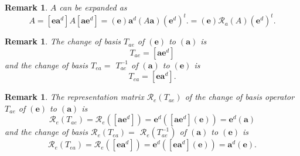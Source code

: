 \documentclass[aps,preprint]{revtex4}%
\newtheorem{remark}[theorem]{Remark}
\begin{document}
\begin{remark}
$A$ can be expanded as%
\begin{equation}
A=\left[  \mathbf{ea}^{d}\right]  A\left[  \mathbf{ae}^{d}\right]  =\left(
\mathbf{e}\right)  \mathbf{a}^{d}\left(  A\mathbf{a}\right)  \left(
\mathbf{e}^{d}\right)  ^{t}.=\left(  \mathbf{e}\right)  \mathcal{R}_{a}\left(
A\right)  \left(  \mathbf{e}^{d}\right)  ^{t}.
\end{equation}

\end{remark}

\begin{remark}
The change of basis $T_{ae}$ of $\left(  \mathbf{e}\right)  $ to $\left(
\mathbf{a}\right)  $ is
\begin{equation}
T_{ae}=\left[  \mathbf{ae}^{d}\right]
\end{equation}
and the change of basis $T_{ea}=$ $T_{ae}^{-1}$ of $\left(  \mathbf{a}\right)
$ to $\left(  \mathbf{e}\right)  $ is
\begin{equation}
T_{ea}=\left[  \mathbf{ea}^{d}\right]  .
\end{equation}

\end{remark}

\begin{remark}
The representation matrix $\mathcal{R}_{e}\left(  T_{ae}\right)  $ of the
change of basis operator$T_{ae}$ of $\left(  \mathbf{e}\right)  $ to $\left(
\mathbf{a}\right)  $ is
\begin{equation}
\mathcal{R}_{e}\left(  T_{ae}\right)  =\mathcal{R}_{e}\left(  \left[
\mathbf{ae}^{d}\right]  \right)  =\mathbf{e}^{d}\left(  \left[  \mathbf{ae}%
^{d}\right]  \left(  \mathbf{e}\right)  \right)  =\mathbf{e}^{d}\left(
\mathbf{a}\right)
\end{equation}
and the change of basis $\mathcal{R}_{e}\left(  T_{ea}\right)  =$
$\mathcal{R}_{e}\left(  T_{ae}^{-1}\right)  $ of $\left(  \mathbf{a}\right)  $
to $\left(  \mathbf{e}\right)  $ is
\begin{equation}
\mathcal{R}_{e}\left(  T_{ea}\right)  =\mathcal{R}_{e}\left(  \left[
\mathbf{ea}^{d}\right]  \right)  =\mathbf{e}^{d}\left(  \left[  \mathbf{ea}%
^{d}\right]  \left(  \mathbf{e}\right)  \right)  =\mathbf{a}^{d}\left(
\mathbf{e}\right)  .
\end{equation}

\end{remark}
\end{document}
